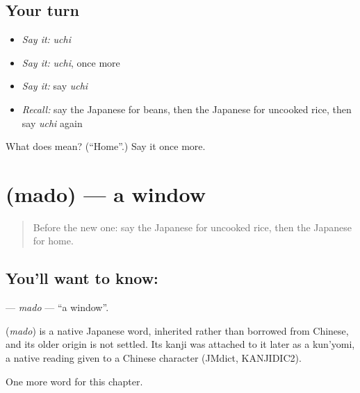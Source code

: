 \subsection*{Your turn}
\begin{itemize}
\raggedright
  \item \emph{Say it:} \emph{uchi}
  \item \emph{Say it:} \emph{uchi}, once more
  \item \emph{Say it:} say \emph{uchi}
  \item \emph{Recall:} say the Japanese for beans, then the Japanese for uncooked rice, then say \emph{uchi} again
\end{itemize}

\begin{tcolorbox}[breakable,colback=teal!4,colframe=teal!35!black,title={Before you move on}]
What does  mean? (\textquotedblleft{}Home\textquotedblright{}.) Say it once more.
\end{tcolorbox}
\section[\texorpdfstring{\ja{まど} (mado)}{まど (mado)}]{ (mado) — a window}

\label{lesson:JA-C37-mado}



\begin{quote}
Before the new one: say the Japanese for uncooked rice, then the Japanese for home.
\end{quote}

\subsection*{You'll want to know: }
\textbf{} — \emph{mado} — \textquotedblleft{}a window\textquotedblright{}.

\begin{cousinweb}
\textbf{} (\emph{mado}) is a native Japanese word, inherited rather than borrowed from Chinese, and its older origin is not settled. Its kanji was attached to it later as a kun'yomi, a native reading given to a Chinese character (JMdict, KANJIDIC2).
\end{cousinweb}

\begin{grammarlens}[title={What you've built}]
One more word for this chapter.
\end{grammarlens}


